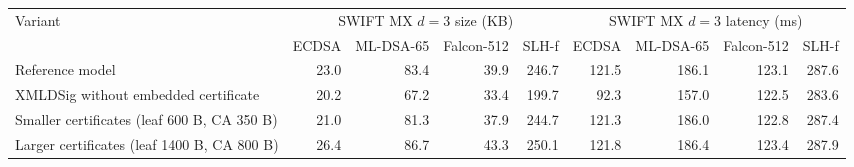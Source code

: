 \begin{tabular}{@{}lrrrrrrrr@{}}
\toprule
Variant & \multicolumn{4}{c}{SWIFT MX $d{=}3$ size (KB)} & \multicolumn{4}{c}{SWIFT MX $d{=}3$ latency (ms)} \\
\cmidrule(lr){2-5}\cmidrule(lr){6-9}
 & ECDSA & ML-DSA-65 & Falcon-512 & SLH-f & ECDSA & ML-DSA-65 & Falcon-512 & SLH-f \\
\midrule
Reference model & 23.0 & 83.4 & 39.9 & 246.7 & 121.5 & 186.1 & 123.1 & 287.6 \\
XMLDSig without embedded certificate & 20.2 & 67.2 & 33.4 & 199.7 & 92.3 & 157.0 & 122.5 & 283.6 \\
Smaller certificates (leaf 600 B, CA 350 B) & 21.0 & 81.3 & 37.9 & 244.7 & 121.3 & 186.0 & 122.8 & 287.4 \\
Larger certificates (leaf 1400 B, CA 800 B) & 26.4 & 86.7 & 43.3 & 250.1 & 121.8 & 186.4 & 123.4 & 287.9 \\
\bottomrule
\end{tabular}
